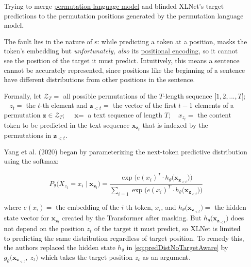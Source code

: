 Trying to merge \hyperref[sec:permutationLM]{permutation language model} and  blinded XLNet's target predictions to the permutation positions generated by the permutation language model. 

The fault lies in the nature of s: while predicting a token at a position,  masks the token's embedding but \emph{unfortunately, also} its \hyperref[sec:PosEncodings]{positional encoding}, so it cannot see the position of the target it must predict. Intuitively, this means a sentence cannot be accurately represented, since positions like the beginning of a sentence have different distributions from other positions in the sentence. 

Formally, let $\mathcal{Z}_T =$ all possible permutations of the $T$-length sequence $\Big[1,2,...,T\Big]$; $\;\;\; z_t =$ the $t$-th element and $\textbf{z}_{< t} =$ the vector of the first $t-1$ elements of a permutation $\textbf{z} \in \mathcal{Z}_T$; $\;\;\; \textbf{x} =$ a text sequence of length $T$; $\;\;\; x_{z_t} =$ the content token to be predicted in the text sequence $\textbf{x}_{\textbf{z}_t}$ that is indexed by the permutations in $\textbf{z}_{< t}$. 

Yang et al. (2020) began by parameterizing the next-token predictive distribution using the softmax: 

\begin{equation}
P_\theta \Big( X_{z_t} = x_i\; | \; \textbf{x}_{\textbf{z}_t} \Big) = \frac{\exp {\Big( e(x_i)^T \cdot h_\theta \Big( \textbf{x}_{\textbf{z}_{< t}} \Big) \Big)}}  {\sum_{i=1} \exp{\Big( e(x_i)^T \cdot h_\theta \Big( \textbf{x}_{\textbf{z}_{< t}} \Big) \Big)}}
\label{eq:predDistNoTargetAware}
\end{equation}

where $e(x_i) =$ the embedding of the $i$-th token, $x_i$, and $h_\theta \Big( \textbf{x}_{\textbf{z}_{< t}} \Big) =$ the hidden state vector for $\textbf{x}_{\textbf{z}_t}$ created by the Transformer after masking. But $h_\theta \Big( \textbf{x}_{\textbf{z}_{< t}} \Big)$ does not depend on the position $z_t$ of the target it must predict, so XLNet is limited to predicting the same distribution regardless of target position. To remedy this, the authors replaced the hidden state $h_\theta$ in \cref{eq:predDistNoTargetAware} by $g_\theta \Big( \textbf{x}_{\textbf{z}_{< t}}, \; z_t \Big)$ which takes the target position $z_t$ as an argument. 




